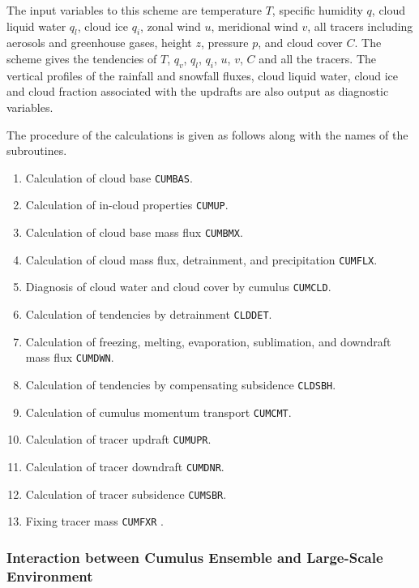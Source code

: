 The input variables to this scheme are temperature \(T\), specific
humidity \(q\), cloud liquid water \(q_l\), cloud ice \(q_i\), zonal
wind \(u\), meridional wind \(v\), all tracers including aerosols and
greenhouse gases, height \(z\), pressure \(p\), and cloud cover \(C\).
The scheme gives the tendencies of \(T\), \(q_v\), \(q_l\), \(q_i\),
\(u\), \(v\), \(C\) and all the tracers. The vertical profiles of the
rainfall and snowfall fluxes, cloud liquid water, cloud ice and cloud
fraction associated with the updrafts are also output as diagnostic
variables.

The procedure of the calculations is given as follows along with the
names of the subroutines.

\begin{enumerate}
\def\labelenumi{\arabic{enumi}.}
\tightlist
\item
  Calculation of cloud base \texttt{CUMBAS}.
\item
  Calculation of in-cloud properties \texttt{CUMUP}.
\item
  Calculation of cloud base mass flux \texttt{CUMBMX}.
\item
  Calculation of cloud mass flux, detrainment, and precipitation
  \texttt{CUMFLX}.
\item
  Diagnosis of cloud water and cloud cover by cumulus \texttt{CUMCLD}.
\item
  Calculation of tendencies by detrainment \texttt{CLDDET}.
\item
  Calculation of freezing, melting, evaporation, sublimation, and
  downdraft mass flux \texttt{CUMDWN}.
\item
  Calculation of tendencies by compensating subsidence \texttt{CLDSBH}.
\item
  Calculation of cumulus momentum transport \texttt{CUMCMT}.
\item
  Calculation of tracer updraft \texttt{CUMUPR}.
\item
  Calculation of tracer downdraft \texttt{CUMDNR}.
\item
  Calculation of tracer subsidence \texttt{CUMSBR}.
\item
  Fixing tracer mass \texttt{CUMFXR} .
\end{enumerate}

\hypertarget{interaction-between-cumulus-ensemble-and-large-scale-environment}{%
\subsubsection{Interaction between Cumulus Ensemble and Large-Scale
Environment}\label{interaction-between-cumulus-ensemble-and-large-scale-environment}}

